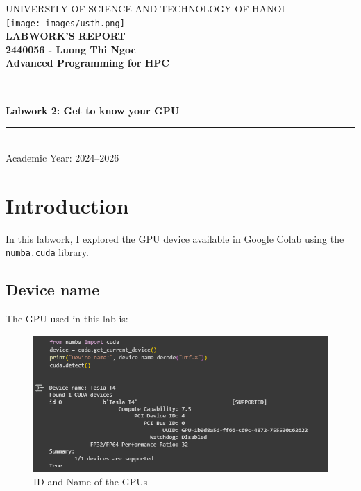 \documentclass[hidelinks,12pt,a4paper]{article}
\begin{document}

\begin{titlepage}

    \begin{center}
        {\large\uppercase{University of Science and Technology of Hanoi}} \\[1.5cm]
        \texttt{[image: images/usth.png]} \\[1cm]
        {\huge \bfseries \uppercase{Labwork's Report}} \\[1cm]
        {\large \bfseries 2440056 - Luong Thi Ngoc} \\[0.5cm]
        {\huge \bfseries {Advanced Programming for HPC}} \\[1cm]
        \rule{\linewidth}{0.3mm} \\[0.4cm]
        {\Huge \bfseries \color{blue} Labwork 2: Get to know your GPU} \\
        \rule{\linewidth}{0.3mm} \\[0.7cm]
        \large Academic Year: 2024--2026
    \end{center}
\end{titlepage}

\clearpage
{}

\section{Introduction}
In this labwork, I explored the GPU device available in Google Colab using the \texttt{numba.cuda} library. 

\subsection{Device name}
The GPU used in this lab is:

\begin{figure}[H]
    \centering
    \includegraphics[width=0.75\linewidth]{fig/ID and Name of the GPUs.png}
    \caption{ID and Name of the GPUs}
    \label{fig:placeholder}
\end{figure}
\end{document}
